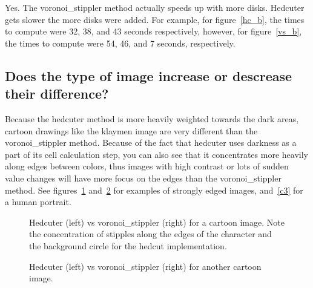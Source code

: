 \documentclass[11pt]{article}
\begin{document}
Yes. The voronoi\_stippler method actually speeds up with more
disks. Hedcuter gets slower the more disks were added. For example,
for figure~\ref{hc_b}, the times to compute were 32, 38, and 43
seconds respectively, however, for figure~\ref{vs_b}, the times to
compute were 54, 46, and 7 seconds, respectively.

\subsection{Does the type of image increase or descrease their difference?}

Because the hedcuter method is more heavily weighted towards the dark
areas, cartoon drawings like the klaymen image are very different than
the voronoi\_stippler method. Because of the fact that hedcuter uses
darkness as a part of its cell calculation step, you can also see that
it concentrates more heavily along edges between colors, thus images
with high contrast or lots of sudden value changes will have more
focus on the edges than the voronoi\_stippler method. See
figures~\ref{c1} and~\ref{c2} for examples of strongly edged images,
and~\ref{c3} for a human portrait.

\begin{figure}[H]
  \centering
  \begin{minipage}{.5\textwidth}
    \centering
    
  \end{minipage}%
  \begin{minipage}{.5\textwidth}
    \centering
    
  \end{minipage}
  \caption{Hedcuter (left) vs voronoi\_stippler (right) for a cartoon
    image. Note the concentration of stipples along the edges of the
    character and the background circle for the hedcut
    implementation.}\label{c1}
\end{figure}

\begin{figure}[H]
  \centering
  \begin{minipage}{.5\textwidth}
    \centering
    
  \end{minipage}%
  \begin{minipage}{.5\textwidth}
    \centering
    
  \end{minipage}
  \caption{Hedcuter (left) vs voronoi\_stippler (right) for another cartoon image.}\label{c2}
\end{figure}
\end{document}
